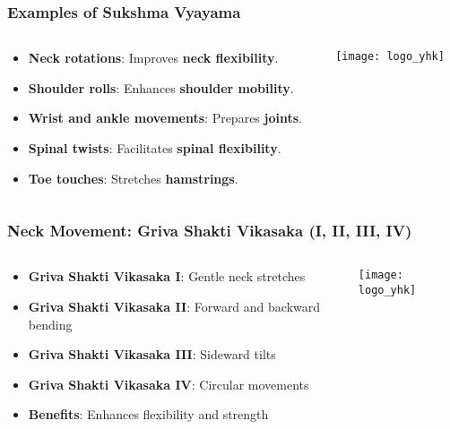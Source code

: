 \begin{frame}[fragile]\frametitle{Examples of Sukshma Vyayama}
\begin{columns}
    \begin{column}[T]{0.5\linewidth}
      \begin{itemize}
        \item \textbf{Neck rotations}: Improves \textbf{neck flexibility}.
        \item \textbf{Shoulder rolls}: Enhances \textbf{shoulder mobility}.
        \item \textbf{Wrist and ankle movements}: Prepares \textbf{joints}.
        \item \textbf{Spinal twists}: Facilitates \textbf{spinal flexibility}.
        \item \textbf{Toe touches}: Stretches \textbf{hamstrings}.
      \end{itemize}
    \end{column}
    \begin{column}[T]{0.5\linewidth}
        \begin{center}
        \texttt{[image: logo\_yhk]}
        \end{center}	
    \end{column}
\end{columns}
\end{frame}

\begin{frame}[fragile]\frametitle{Neck Movement: Griva Shakti Vikasaka (I, II, III, IV)}
\begin{columns}
    \begin{column}[T]{0.5\linewidth}
      \begin{itemize}
		\item \textbf{Griva Shakti Vikasaka I}: Gentle neck stretches
		\item \textbf{Griva Shakti Vikasaka II}: Forward and backward bending
		\item \textbf{Griva Shakti Vikasaka III}: Sideward tilts
		\item \textbf{Griva Shakti Vikasaka IV}: Circular movements
		\item \textbf{Benefits}: Enhances flexibility and strength
	  \end{itemize}
    \end{column}
    \begin{column}[T]{0.5\linewidth}
		\begin{center}
		\texttt{[image: logo\_yhk]}
		\end{center}	
    \end{column}
\end{columns}
\end{frame}

